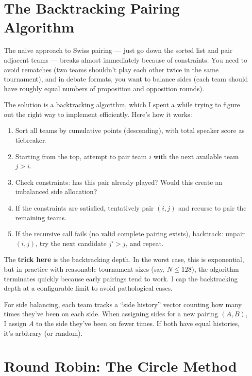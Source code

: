 \documentclass[11pt]{article}
\begin{document}
\section{The Backtracking Pairing Algorithm}

The naive approach to Swiss pairing --- just go down the sorted list and pair adjacent teams --- breaks almost immediately because of constraints. You need to avoid rematches (two teams shouldn't play each other twice in the same tournament), and in debate formats, you want to balance sides (each team should have roughly equal numbers of proposition and opposition rounds).

The solution is a backtracking algorithm, which I spent a while trying to figure out the right way to implement efficiently. Here's how it works:

\begin{enumerate}
    \item Sort all teams by cumulative points (descending), with total speaker score as tiebreaker.
    \item Starting from the top, attempt to pair team $i$ with the next available team $j > i$.
    \item Check constraints: has this pair already played? Would this create an imbalanced side allocation?
    \item If the constraints are satisfied, tentatively pair $(i, j)$ and recurse to pair the remaining teams.
    \item If the recursive call fails (no valid complete pairing exists), backtrack: unpair $(i, j)$, try the next candidate $j' > j$, and repeat.
\end{enumerate}

The \textbf{trick here} is the backtracking depth. In the worst case, this is exponential, but in practice with reasonable tournament sizes (say, $N \leq 128$), the algorithm terminates quickly because early pairings tend to work. I cap the backtracking depth at a configurable limit to avoid pathological cases.

For side balancing, each team tracks a ``side history'' vector counting how many times they've been on each side. When assigning sides for a new pairing $(A, B)$, I assign $A$ to the side they've been on fewer times. If both have equal histories, it's arbitrary (or random).

\section{Round Robin: The Circle Method}
\end{document}
